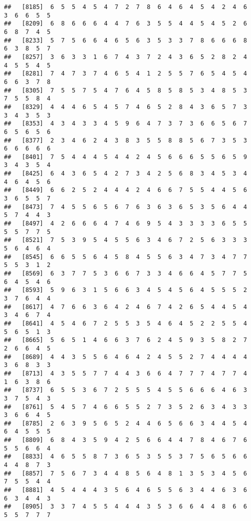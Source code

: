 \documentclass[
]{book}
\begin{document}
\begin{verbatim}
##   [8185]  6  5  5  4  5  4  7  2  7  8  6  4  6  4  5  4  2  4  6  3  6  6  5  5
##   [8209]  6  8  6  6  6  4  4  7  6  3  5  5  4  4  5  4  5  2  6  6  8  7  4  5
##   [8233]  5  7  5  6  6  4  6  5  6  3  5  3  3  7  8  6  6  6  8  6  3  8  5  7
##   [8257]  3  6  3  3  1  6  7  4  3  7  2  4  3  6  5  2  8  2  4  4  5  5  4  5
##   [8281]  7  4  7  3  7  4  6  5  4  1  2  5  5  7  6  5  4  5  4  6  6  3  7  8
##   [8305]  7  5  5  7  5  4  7  6  4  5  8  5  8  5  3  4  8  5  3  7  5  5  8  4
##   [8329]  4  4  4  6  5  4  5  7  4  6  5  2  8  4  3  6  5  7  3  3  4  3  5  3
##   [8353]  4  3  4  3  3  4  5  9  6  4  7  3  7  3  6  6  5  6  7  6  5  6  5  6
##   [8377]  2  3  4  6  2  4  3  8  3  5  5  8  8  5  6  7  3  5  3  6  6  6  6  6
##   [8401]  7  5  4  4  4  5  4  4  2  4  5  6  6  6  5  5  6  5  9  3  4  3  5  4
##   [8425]  6  4  3  6  5  4  2  7  3  4  2  5  6  8  3  4  5  3  4  4  6  4  5  6
##   [8449]  6  6  2  5  2  4  4  4  2  4  6  6  7  5  5  4  4  5  6  3  6  5  5  7
##   [8473]  7  4  5  5  6  5  6  7  6  3  6  3  6  5  3  5  6  4  4  5  7  4  4  3
##   [8497]  4  2  6  6  6  4  7  4  6  9  5  4  3  3  3  3  6  5  5  5  5  7  7  5
##   [8521]  7  5  3  9  5  4  5  5  6  3  4  6  7  2  5  6  3  3  3  5  6  4  6  4
##   [8545]  6  6  5  5  6  4  5  8  4  5  5  6  3  4  7  3  4  7  7  5  5  3  1  2
##   [8569]  6  3  7  7  5  3  6  6  7  3  3  4  6  6  4  5  7  7  5  6  4  5  4  6
##   [8593]  5  9  6  3  1  5  6  6  3  4  5  4  5  6  4  5  5  5  2  3  7  6  4  4
##   [8617]  4  7  6  6  3  6  4  2  4  6  7  4  2  6  5  4  4  5  4  3  4  6  7  4
##   [8641]  4  5  4  6  7  2  5  5  3  5  4  6  4  5  2  2  5  5  4  5  6  5  1  3
##   [8665]  5  6  5  1  4  6  6  3  7  6  2  4  5  9  3  5  8  2  7  2  6  6  4  5
##   [8689]  4  4  3  5  5  6  4  6  4  2  4  5  5  2  7  4  4  4  4  3  6  8  3  3
##   [8713]  4  3  5  5  7  7  4  4  3  6  6  4  7  7  7  4  7  7  4  1  6  3  8  6
##   [8737]  6  5  5  3  6  7  2  5  5  5  4  5  5  6  6  6  4  6  3  3  7  5  4  3
##   [8761]  5  4  5  7  4  6  6  5  5  2  7  3  5  2  6  3  4  3  3  3  6  6  4  5
##   [8785]  2  6  3  9  5  6  5  2  4  4  6  5  6  6  3  4  4  5  4  6  4  5  5  5
##   [8809]  6  8  4  3  5  9  4  2  5  6  6  4  4  7  8  4  6  7  6  5  5  6  6  4
##   [8833]  4  6  5  5  8  7  3  6  5  3  5  5  3  7  5  6  5  6  6  4  4  8  7  3
##   [8857]  7  5  6  7  3  4  4  8  5  6  4  8  1  3  5  3  4  5  6  7  5  5  4  4
##   [8881]  4  5  4  4  4  3  5  6  4  6  5  5  6  3  4  4  6  3  6  6  3  4  4  3
##   [8905]  3  3  7  4  5  5  4  4  4  3  5  3  6  6  4  4  8  6  6  5  5  7  7  7

\end{verbatim}
\end{document}
